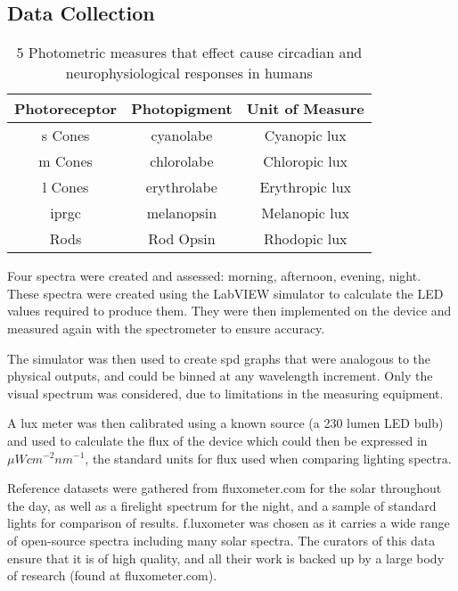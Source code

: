 \subsection{Data Collection}

\begin{table*}[tb]
\centering
\begin{tabular}{c|c|c}
Photoreceptor     & Photopigment & Unit of Measure   \\\hline\hline
\acrfull{s} Cones & cyanolabe   & Cyanopic lux      \\\hline
\acrfull{m} Cones & chlorolabe  & Chloropic lux  	\\\hline
\acrfull{l} Cones & erythrolabe & Erythropic lux	\\\hline
\acrfull{iprgc}   & melanopsin  & Melanopic lux  	\\\hline
Rods              & Rod Opsin   & Rhodopic lux    
\end{tabular}
\caption{5 Photometric measures that effect cause circadian and neurophysiological responses in humans \citep{lucasMeasuringUsingLight2014}}
\label{Tab:photometrics}
\end{table*}


Four spectra were created and assessed: \acrfull{morning}, \acrfull{afternoon}, \acrfull{evening}, \acrfull{night}. These spectra were created using the LabVIEW simulator to calculate the LED values required to produce them. They were then implemented on the device and measured again with the spectrometer to ensure accuracy.

The simulator was then used to create \acrfull{spd} graphs that were analogous to the physical outputs, and could be binned at any wavelength increment. Only the visual spectrum was considered, due to limitations in the measuring equipment.

A \gls{lux} meter was then calibrated using a known source (a 230 lumen LED bulb) and used to calculate the \gls{flux} of the device which could then be expressed in $\mu W cm^{-2} nm^{-1}$, the standard units for \gls{flux} used when comparing lighting spectra.

Reference datasets were gathered from fluxometer.com \citep{f.luxsoftwarellcLuxometer} for the \gls{solar} throughout the day, as well as a firelight spectrum for the night, and a sample of standard lights for comparison of results. f.luxometer was chosen as it carries a wide range of open-source spectra including many solar spectra. The curators of this data ensure that it is of high quality, and all their work is backed up by a large body of research (found at fluxometer.com).

